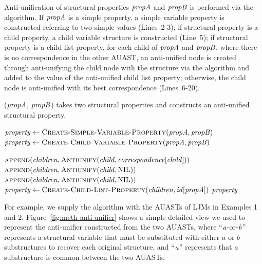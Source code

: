 Anti-unification of structural properties $\mathit{propA}$ and $\mathit{propB}$ is performed via the  algorithm. If $\mathit{propA}$ is a simple property, a simple variable property is constructed referring to two simple values (Lines~2-3); if structural property is a child property, a child variable structure is constructed (Line~5); if structural property is a child list property, for each child of $\mathit{propA}$ and $\mathit{propB}$, where there is no correspondence in the other AUAST, an anti-unified node is created through anti-unifying the child node with the \NIL{} structure via the  algorithm and added to the value of the anti-unified child list property; otherwise, the child node is anti-unified with its best correspondence (Lines~6-20).


\begin{algorithm}
 \caption{($\mathit{propA}$, $\mathit{propB}$) takes two structural properties and constructs an anti-unified structural property.}
  \label{AntiUnify}
  \begin{algorithmic}[1]
\AntiUnifyProperty
{}

	      \State $\mathit{property} \gets  \textsc{Create-Simple-Variable-Property}(\mathit{propA},\mathit{propB})$
			\State $\mathit{property} \gets  \textsc{Create-Child-Variable-Property}(\mathit{propA},\mathit{propB})$
	
	  \State $\textsc{append}(\mathit{children},\textsc{Antiunify}(\mathit{child}, \mathit{correspondence}[\mathit{child}]))$
	   \Else 	
	    \State $\textsc{append}(\mathit{children},\textsc{Antiunify}(\mathit{child}, \textrm{NIL}))$
	    \EndIf
      \EndFor
	    \State $\textsc{append}(\mathit{children},\textsc{Antiunify}(\mathit{child}, \textrm{NIL}))$
	    \EndIf
      \EndFor
		\State $\mathit{property} \gets  \textsc{Create-Child-List-Property}(\mathit{children},\mathit{id[propA]})$
    \EndIf
\Return $\mathit{property}$
\end{algorithmic}
\end{algorithm}


For example, we supply the  algorithm with the AUASTs of LJMs in Examples 1 and 2. Figure~\ref{fig:meth-anti-unifier} shows a simple detailed view we used to represent the anti-unifier constructed from the two AUASTs, where ``$\mathit{a}$-or-$\mathit{b}$'' represents a structural variable that must be substituted with either $a$ or $b$ substructures to recover each original structure, and ``$\mathit{a}$'' represents that $a$  substructure is common between the two AUASTs.


